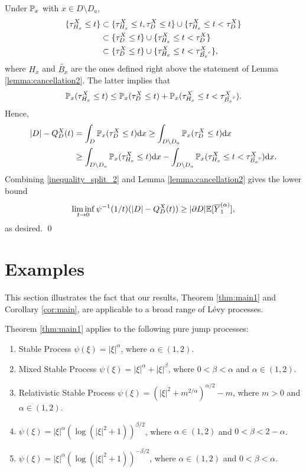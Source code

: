 \documentclass[11pt]{article}
\begin{document}
\begin{doublespace}
Under $\P_x$ with $x\in D\setminus D_a$, 
\begin{align}\label{eqn:containments}
\{\tau_{H_x}^{X}\leq t\} 
&\subset \{\tau_{H_x}^{X}\leq t, \tau_{D}^{X} \leq t\} \cup \{\tau_{H_x}^{X}\leq t<\tau_{D}^{X} \}\notag\\
&\subset  \{\tau_{D}^{X} \leq t\} \cup \{\tau_{H_x}^{X}\leq t <\tau_{D}^{X} \}\notag\\
&\subset  \{\tau_{D}^{X} \leq t\} \cup \{\tau_{H_x}^{X}\leq t <\tau_{\tilde{B_x}^{c}}^{X} \},
\end{align}
where $H_x$ and $\tilde{B_x}$ are the ones defined right above the statement of Lemma \ref{lemma:cancellation2}. 
The latter implies that
\[
\P_{x}(\tau_{H_x}^{X}\leq t)\leq \P_{x}(\tau_{D}^{X} \leq t) + \P_{x}(\tau_{H_x}^{X}\leq t <\tau_{\tilde{B_x}^{c}}^{X} ).
\]
Hence, 
\begin{align*}
|D|-Q^{X}_{D}(t)
&=\int_{D}\P_{x}(\tau^{X}_{D}\leq t)\ud x
\geq \int_{D\setminus D_{a}}\P_{x}(\tau^{X}_{D}\leq t)\ud x\\
&\geq \int_{D\setminus D_{a}}\P_{x}(\tau_{H_x}^{X}\leq t)\ud x-\int_{D\setminus D_{a}}\P_{x}(\tau_{H_x}^{X}\leq t <\tau_{\tilde{B_x}^{c}}^{X} )\ud x.
\end{align*}
Combining \eqref{inequality_split_2} and Lemma \ref{lemma:cancellation2} gives the lower bound
\[
\liminf_{t\to0}\psi^{-1}(1/t)(|D|-Q_{D}^{X}(t))\geq |\partial D|\E[\overline{Y}^{(\alpha)}_{1}],
\]
as desired.
\qed



\section{Examples}\label{section:examples}
This section illustrates the fact that our results, Theorem \ref{thm:main1} and Corollary \ref{cor:main}, are applicable to a broad range of L\'evy processes.  

\begin{example}\label{example:pure jump}
\begin{em}
Theorem \ref{thm:main1} applies to the following pure jump processes:
\begin{enumerate}
\item Stable Process $\psi(\xi)=|\xi|^\alpha$, where $\alpha\in (1, 2)$.
\item Mixed Stable Process $\psi(\xi)=|\xi|^\alpha+|\xi|^\beta$,  where $0<\beta<\alpha$ and $\alpha\in (1,2)$.
\item Relativistic Stable Process $\psi(\xi)=(|\xi|^2+m^{2/\alpha})^{\alpha/2}-m$,  where $m>0$ and $\alpha\in (1,2)$.
\item $\psi(\xi)=|\xi|^\alpha(\log(|\xi|^2+1))^{\beta/2}$,  where $\alpha\in (1, 2)$ and $0<\beta<2-\alpha$.
\item $\psi(\xi)=|\xi|^\alpha(\log(|\xi|^2+1))^{-\beta/2}$,  where $\alpha\in (1,2)$ and $0<\beta<\alpha$.
\end{enumerate}


\end{em}
\end{example}
\end{doublespace}
\end{document}
